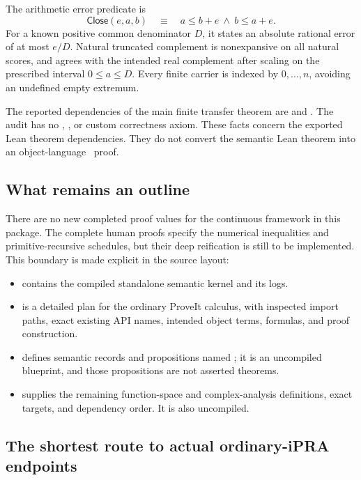 The arithmetic error predicate is
\[
 \mathsf{Close}(e,a,b)\quad\equiv\quad a\leq b+e\ \wedge\ b\leq a+e.
\]
For a known positive common denominator \(D\), it states an absolute rational error of at most \(e/D\). Natural truncated complement is nonexpansive on all natural scores, and agrees with the intended real complement after scaling on the prescribed interval \(0\leq a\leq D\). Every finite carrier is indexed by \(0,\ldots,n\), avoiding an undefined empty extremum.

The reported dependencies of the main finite transfer theorem are  and . The audit has no , , or custom correctness axiom. These facts concern the exported Lean theorem dependencies. They do not convert the semantic Lean theorem into an object-language \ipra\ proof.

\subsection{What remains an outline}

There are no new completed  proof values for the continuous framework in this package. The complete human proofs specify the numerical inequalities and primitive-recursive schedules, but their deep reification is still to be implemented. This boundary is made explicit in the source layout:

\begin{itemize}
\item {} contains the compiled standalone semantic kernel and its logs.
\item {} is a detailed plan for the ordinary ProveIt calculus, with inspected import paths, exact existing API names, intended object terms, formulas, and proof construction.
\item {} defines semantic records and propositions named ; it is an uncompiled blueprint, and those propositions are not asserted theorems.
\item {} supplies the remaining function-space and complex-analysis definitions, exact targets, and dependency order. It is also uncompiled.
\end{itemize}

\subsection{The shortest route to actual ordinary-iPRA endpoints}

